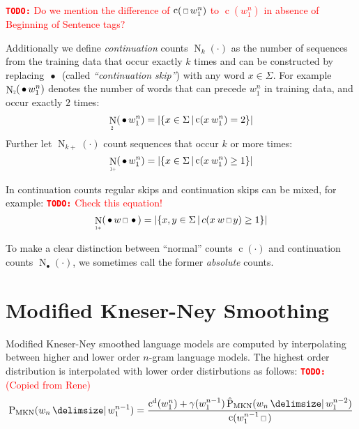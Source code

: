 \documentclass[m,bachelor,binding,palatino]{WeSTthesis}
\newcommand*{\Scale}[2][4]{\scalebox{#1}{$#2$}}%
\newcommand{\DummyArg}{\cdot}
\newcommand{\DummyIndex}{\bullet}
\newcommand{\Cardinality}[1]{\left|#1\right|}
\DeclareMathOperator{\Count}{c}
\DeclareMathOperator{\ContCount}{N}
\newcommand{\ContCountIp}  {\ContCount_{\Scale[0.5]{1+}}}
\newcommand{\ContCountII}  {\ContCount_{\Scale[0.5]{2 }}}
\newcommand{\Skp}{\ensuremath{\,\Scale[0.7]{\square}\,}}
\newcommand{\WSkp}{\ensuremath{\,\bullet\,}}
\newenvironment{draft}{\color{draftcolor}}{}
\newcommand{\todo}[1]{\textcolor{red}{{\footnotesize\textbf{\texttt{TODO:}}} #1}}
\begin{document}
\todo{Do we mention the difference of $\Count(\Skp w_1^n)$ to $\Count(w_1^n)$
in absence of Beginning of Sentence tags?}

Additionally we define \emph{continuation} counts $\ContCount_k(\DummyArg)$ as
the number of sequences from the training data that occur exactly $k$ times and
can be constructed by replacing $\WSkp$ (called \emph{``continuation skip''})
with any word $x \in \Sigma$.
For example $\ContCountII(\WSkp w_1^n)$ denotes the number of words that can
precede $w_1^n$ in training data, and occur exactly $2$ times:
\begin{equation}
  \ContCountII(\WSkp w_1^n) =
    \Cardinality{\left\{ x \in \Sigma \,\middle|\, \Count(x \: w_1^n) = 2 \right\}}
\end{equation}
Further let $\ContCount_{k+}(\DummyArg)$ count sequences that occur $k$ or more
times:
\begin{equation}
  \ContCountIp(\WSkp w_1^n) =
    \Cardinality{\left\{ x \in \Sigma \,\middle|\, \Count(x \: w_1^n) \geq 1 \right\}}
\end{equation}

In continuation counts regular skips and continuation skips can be mixed, for
example:
\todo{Check this equation!}
\begin{equation}
  \ContCountIp(\WSkp w \Skp \WSkp) =
    \Cardinality{\left\{ x, y \in \Sigma \,\middle|\, c(x \: w \Skp y) \geq 1 \right\}}
\end{equation}

To make a clear distinction between ``normal'' counts $\Count(\DummyArg)$ and
continuation counts $\ContCount_{\DummyIndex}(\DummyArg)$, we
sometimes call the former \emph{absolute} counts.

\section{Modified Kneser-Ney Smoothing}
\label{sec:review-lm-mkn}

\begin{draft}
Modified Kneser-Ney smoothed language models are computed by interpolating
between higher and lower order $n$-gram language models.
The highest order distribution is interpolated with lower order distirbutions
as follows:
\todo{(Copied from Rene)}
\end{draft}
\begin{equation}
  \label{eq:mkn-high}
  \ProbMKN{w_n}{w_1^{n-1}} =
    \frac{\DiscountedCount(w_1^n) + \gamma(w_1^{n-1}) \ProbMKN*{w_n}{w_1^{n-2}}}
         {\Count(w_1^{n-1} \Skp)} \\
\end{equation}
\end{document}
